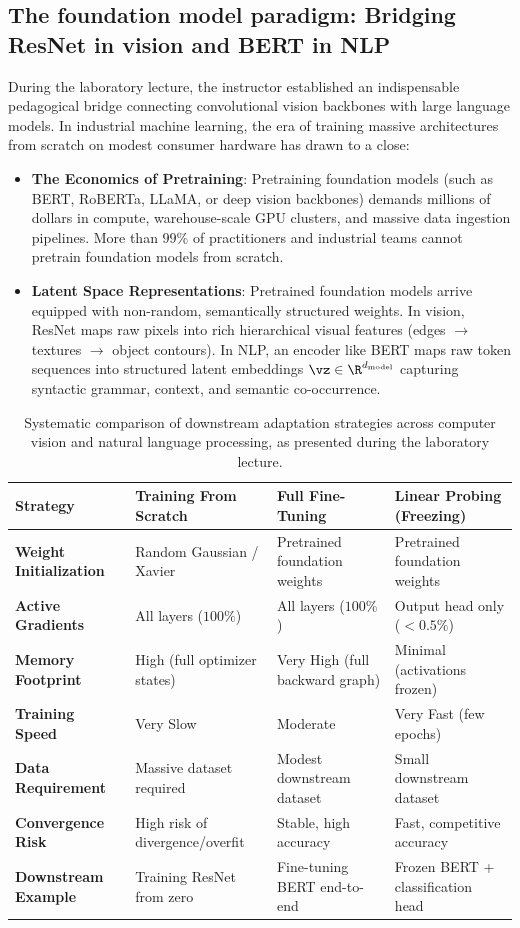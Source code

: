 \documentclass[../labs.tex]{subfiles}
\begin{document}
\subsection{The foundation model paradigm: Bridging ResNet in vision and BERT in NLP}
During the laboratory lecture, the instructor established an indispensable pedagogical bridge connecting convolutional vision backbones with large language models. In industrial machine learning, the era of training massive architectures from scratch on modest consumer hardware has drawn to a close:
\begin{itemize}
    \item \textbf{The Economics of Pretraining}: Pretraining foundation models (such as BERT, RoBERTa, LLaMA, or deep vision backbones) demands millions of dollars in compute, warehouse-scale GPU clusters, and massive data ingestion pipelines. More than $99\%$ of practitioners and industrial teams cannot pretrain foundation models from scratch.
    \item \textbf{Latent Space Representations}: Pretrained foundation models arrive equipped with non-random, semantically structured weights. In vision, ResNet maps raw pixels into rich hierarchical visual features (edges $\to$ textures $\to$ object contours). In NLP, an encoder like BERT maps raw token sequences into structured latent embeddings $\vz \in \R^{d_{\text{model}}}$ capturing syntactic grammar, context, and semantic co-occurrence.
\end{itemize}

\begin{table}[htbp]
\centering
\small
\begin{tabularx}{\textwidth}{>{\bfseries}l >{\raggedright}X >{\raggedright}X >{\raggedright\arraybackslash}X}
\toprule
\textbf{Strategy} & \textbf{Training From Scratch} & \textbf{Full Fine-Tuning} & \textbf{Linear Probing (Freezing)} \\
\midrule
Weight Initialization & Random Gaussian / Xavier & Pretrained foundation weights & Pretrained foundation weights \\
Active Gradients & All layers ($100\%$) & All layers ($100\%$) & Output head only ($< 0.5\%$) \\
Memory Footprint & High (full optimizer states) & Very High (full backward graph) & Minimal (activations frozen) \\
Training Speed & Very Slow & Moderate & Very Fast (few epochs) \\
Data Requirement & Massive dataset required & Modest downstream dataset & Small downstream dataset \\
Convergence Risk & High risk of divergence/overfit & Stable, high accuracy & Fast, competitive accuracy \\
Downstream Example & Training ResNet from zero & Fine-tuning BERT end-to-end & Frozen BERT + classification head \\
\bottomrule
\end{tabularx}
\caption{Systematic comparison of downstream adaptation strategies across computer vision and natural language processing, as presented during the laboratory lecture.}
\label{tab:adaptation_strategies}
\end{table}
\end{document}
